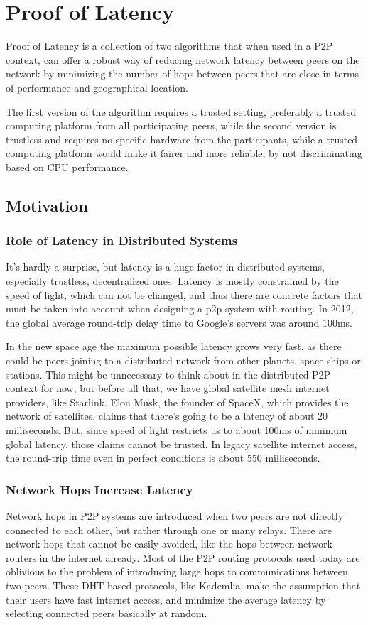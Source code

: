 \chapter{Proof of Latency}
\label{Proof of Latency}
Proof of Latency is a collection of two algorithms that when used in a P2P context, can offer a robust way of reducing network latency between peers on the network by minimizing the number of hops between peers that are close in terms of performance and geographical location.

The first version of the algorithm requires a trusted setting, preferably a trusted computing platform from all participating peers, while the second version is trustless and requires no specific hardware from the participants, while a trusted computing platform would make it fairer and more reliable, by not discriminating based on CPU performance.
\section{Motivation}
\subsection{Role of Latency in Distributed Systems}
It's hardly a surprise, but latency is a huge factor in distributed systems, especially trustless, decentralized ones. Latency is mostly constrained by the speed of light, which can not be changed, and thus there are concrete factors that must be taken into account when designing a p2p system with routing. In 2012, the global average round-trip delay time to Google's servers was around 100ms.\cite{Latency}

In the new space age the maximum possible latency grows very fast, as there could be peers joining to a distributed network from other planets, space ships or stations. This might be unnecessary to think about in the distributed P2P context for now, but before all that, we have global satellite mesh internet providers, like Starlink. Elon Musk, the founder of SpaceX, which provides the network of satellites, claims that there's going to be a latency of about 20 milliseconds.\cite{Musk} But, since speed of light restricts us to about 100ms of minimum global latency\cite{Latency}, those claims cannot be trusted. In legacy satellite internet access, the round-trip time even in perfect conditions is about 550 milliseconds.\cite{noauthor_satellite_nodate}

\subsection{Network Hops Increase Latency}
Network hops in P2P systems are introduced when two peers are not directly connected to each other, but rather through one or many relays. There are network hops that cannot be easily avoided, like the hops between network routers in the internet already. Most of the P2P routing protocols used today are oblivious to the problem of introducing large hops to communications between two peers. These DHT-based protocols, like Kademlia, make the assumption that their users have fast internet access, and minimize the average latency by selecting connected peers basically at random.

